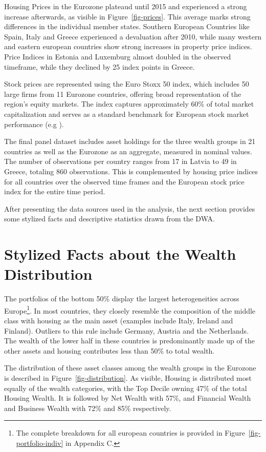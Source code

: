 \documentclass[
  a4paper,
  DIV=11,
  numbers=noendperiod]{scrartcl}
\begin{document}
Housing Prices in the Eurozone plateaud until 2015 and experienced a
strong increase afterwards, as visible in Figure~\ref{fig-prices}. This
average marks strong differences in the individual member states.
Southern European Countries like Spain, Italy and Greece experienced a
devaluation after 2010, while many western and eastern european
countries show strong increases in property price indices. Price Indices
in Estonia and Luxemburg almost doubled in the observed timeframe, while
they declined by 25 index points in Greece.

Stock prices are represented using the Euro Stoxx 50 index, which
includes 50 large firms from 11 Eurozone countries, offering broad
representation of the region's equity markets. The index captures
approximately 60\% of total market capitalization and serves as a
standard benchmark for European stock market performance (e.g
).

The final panel dataset includes asset holdings for the three wealth
groups in 21 countries as well as the Eurozone as an aggregate, measured
in nominal values. The number of observations per country ranges from 17
in Latvia to 49 in Greece, totaling 860 observations. This is
complemented by housing price indices for all countries over the
observed time frames and the European stock price index for the entire
time period.

After presenting the data sources used in the analysis, the next section
provides some stylized facts and descriptive statistics drawn from the
DWA.

\section{Stylized Facts about the Wealth
Distribution}\label{sec-descriptive}

The portfolios of the bottom 50\% display the largest heterogeneities
across Europe\footnote{The complete breakdown for all european countries
  is provided in Figure~\ref{fig-portfolio-indiv} in Appendix C.}. In
most countries, they closely resemble the composition of the middle
class with housing as the main asset (examples include Italy, Ireland
and Finland). Outliers to this rule include Germany, Austria and the
Netherlands. The wealth of the lower half in these countries is
predominantly made up of the other assets and housing contributes less
than 50\% to total wealth.

The distribution of these asset classes among the wealth groups in the
Eurozone is described in Figure~\ref{fig-distribution}. As visible,
Housing is distributed most equally of the wealth categories, with the
Top Decile owning 47\% of the total Housing Wealth. It is followed by
Net Wealth with 57\%, and Financial Wealth and Business Wealth with 72\%
and 85\% respectively.
\end{document}
